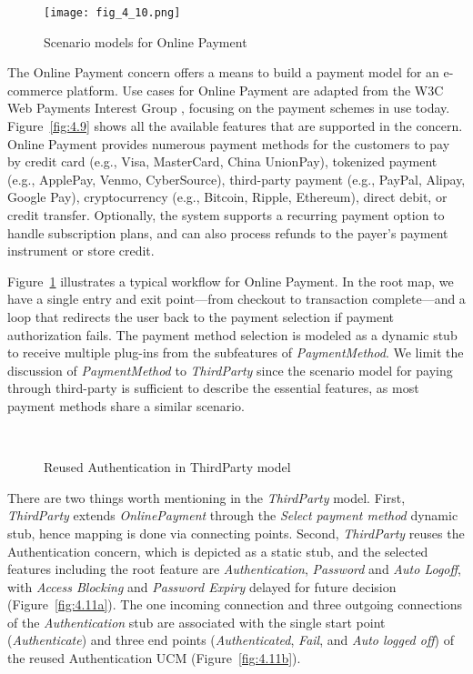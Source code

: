 \begin{figure}
	\centering
	\texttt{[image: fig\_4\_10.png]}
	\caption{Scenario models for Online Payment}
	\label{fig:4.10}
\end{figure}

The Online Payment concern offers a means to build a payment model for an e-commerce platform. Use cases for Online Payment are adapted from the W3C Web Payments Interest Group \cite{w3c2015web}, focusing on the payment schemes in use today. Figure~\ref{fig:4.9} shows all the available features that are supported in the concern. Online Payment provides numerous payment methods for the customers to pay by credit card (e.g., Visa, MasterCard, China UnionPay), tokenized payment (e.g., ApplePay, Venmo, CyberSource), third-party payment (e.g., PayPal, Alipay, Google Pay), cryptocurrency (e.g., Bitcoin, Ripple, Ethereum), direct debit, or credit transfer. Optionally, the system supports a recurring payment option to handle subscription plans, and can also process refunds to the payer's payment instrument or store credit.

Figure~\ref{fig:4.10} illustrates a typical workflow for Online Payment. In the root map, we have a single entry and exit point---from checkout to transaction complete---and a loop that redirects the user back to the payment selection if payment authorization fails. The payment method selection is modeled as a dynamic stub to receive multiple plug-ins from the subfeatures of \emph{PaymentMethod}. We limit the discussion of \emph{PaymentMethod} to \emph{ThirdParty} since the scenario model for paying through third-party is sufficient to describe the essential features, as most payment methods share a similar scenario.

\begin{figure}
	\centering
	 \\
	\caption{Reused Authentication in ThirdParty model}
	\label{fig:4.11}
\end{figure}

There are two things worth mentioning in the \emph{ThirdParty} model. First, \emph{ThirdParty} extends \emph{OnlinePayment} through the \emph{Select payment method} dynamic stub, hence mapping is done via connecting points. Second, \emph{ThirdParty} reuses the Authentication concern, which is depicted as a static stub, and the selected features including the root feature are \emph{Authentication}, \emph{Password} and \emph{Auto Logoff}, with \emph{Access Blocking} and \emph{Password Expiry} delayed for future decision (Figure~\ref{fig:4.11a}). The one incoming connection and three outgoing connections of the \emph{Authentication} stub are associated with the single start point (\emph{Authenticate}) and three end points (\emph{Authenticated}, \emph{Fail}, and \emph{Auto logged off}) of the reused Authentication UCM (Figure~\ref{fig:4.11b}).

